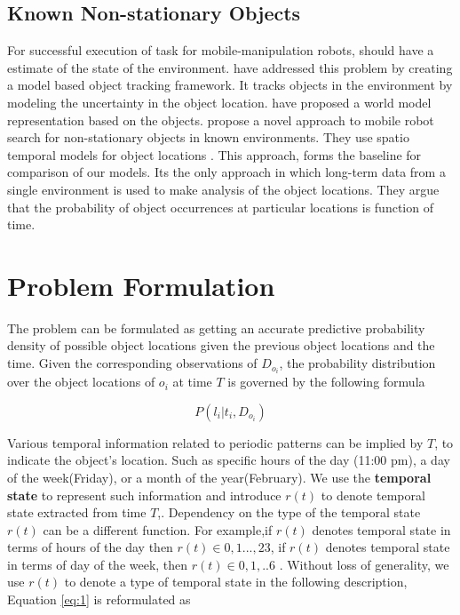 \documentclass{llncs}
\begin{document}
\subsection{Known Non-stationary Objects}
For successful execution of task for mobile-manipulation robots, should have a estimate of the state of the environment. \cite{elfring_semantic_2013} have addressed this problem by creating a model based object tracking framework. It tracks objects in the environment by modeling the uncertainty in the object location.
\cite{wong_manipulation-based_2013} have proposed a world model representation based on the objects. 
\cite{krajnik_wheres_2015}  propose a novel  approach  to  mobile  robot
search  for  non-stationary  objects  in known  environments. They use spatio temporal models for object locations .
This approach, forms the baseline for comparison of our models. Its the only approach in which long-term data from a single environment is used to make analysis of the object locations. They argue that the  probability of object occurrences at particular locations is function of time.
%
\section{Problem Formulation}
The problem can be formulated as getting an accurate predictive probability density of possible object locations given the previous object locations and the time. Given the corresponding observations of $D_{o_i}$, the probability distribution over the object locations of $o_i$ at time $T$ is governed by the following formula 

    \begin{equation} \label{eq:1}
	    P(l_i | t_i, D_{o_i})
    \end{equation}

   Various temporal information related to periodic patterns can be implied by $T$, to indicate the object's location. Such as specific hours of the day (11:00 pm), a day of the week(Friday), or a month of the year(February). We use the \textbf{temporal state} to represent such information and introduce $r(t)$ to denote temporal state extracted from time $T$,.  Dependency on the type of the temporal state $r(t)$ can be a different function. For example,if $r(t)$ denotes temporal state in terms of hours of the day then $r(t) \in {0,1 ... , 23}$, if $r(t)$ denotes temporal state in terms of day of the week, then $r(t) \in {0,1, .. 6}$ . Without loss of generality, we use $r(t)$ to denote a type of temporal state in the following description, Equation \ref{eq:1} is reformulated as 
    
\end{document}
